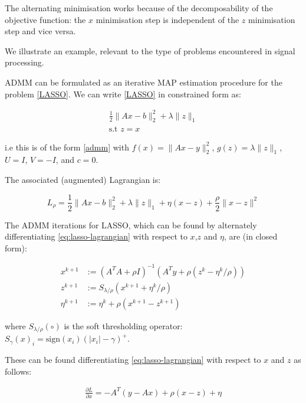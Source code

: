 \documentclass{article}
\begin{document}
The alternating minimisation works because of the decomposability of the objective function: the \(x\) minimisation step is independent of the \(z\) minimisation step and vice versa.  

We illustrate an example, relevant to the type of problems encountered in signal processing.

ADMM can be formulated as an iterative MAP estimation procedure for the problem \eqref{LASSO}. We can write \eqref{LASSO} in constrained form as:

\begin{eqnarray}
\frac{1}{2}\|Ax-b\|_2^2 + \lambda\|z\|_1 \\
\text{s.t } z = x
\end{eqnarray}

i.e this is of the form \eqref{admm} with \( f\left(x\right) =\|Ax-y\|_2^2\), \(g\left(z\right) = \lambda\|z\|_1\), \(U=I\), \(V=-I\), and \(c=0\).

The associated (augmented) Lagrangian is:

\begin{equation}
L_\rho = \frac{1}{2}\|Ax-b\|_2^2 + \lambda\|z\|_1 + \eta\left(x-z\right) + \frac{\rho}{2}\|x-z\|^2
\label{eq:lasso-lagrangian}
\end{equation}

The ADMM iterations for LASSO, which can be found by alternately differentiating \eqref{eq:lasso-lagrangian} with respect to \(x\),\(z\) and \(\eta\), are (in closed form):

\begin{align}
x^{k+1} &:= \left(A^TA + \rho I\right)^{-1}\left(A^Ty +\rho\left( z^k - \eta^k/\rho\right)\right)\\
z^{k+1} &:= S_{\lambda/\rho}\left(x^{k+1} + \eta^k/\rho\right)
 \\
\eta^{k+1} &:= \eta^{k} + \rho\left(x^{k+1}-z^{k+1}\right)
\label{admm_algo_lasso}
\end{align}

where \(S_{\lambda/\rho}\left(\circ\right)\) is the soft thresholding operator: \(S_\gamma\left(x\right)_i = \mathrm{sign}(x_i)\left(|x_i| - \gamma\right)^+\).

These can be found differentiating \eqref{eq:lasso-lagrangian} with respect to \(x\) and \(z\) as follows:

\begin{align*}
\frac{\partial L}{\partial x } = -A^T\left(y-Ax\right) + \rho (x-z) + \eta
\end{align*}
\end{document}
